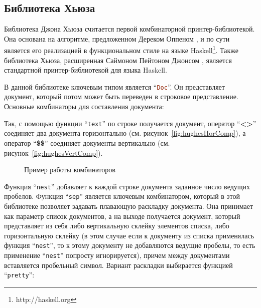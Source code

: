 \subsection{Библиотека Хьюза}

Библиотека Джона Хьюза\cite{hughes} считается первой комбинаторной принтер-библиотекой. Она основана на алгоритме, предложенном Дереком Оппеном \cite{oppen}, и по сути является его реализацией в функциональном стиле на языке Haskell\footnote{http://haskell.org}. Также библиотека Хьюза, расширенная Саймоном Пейтоном Джонсом \cite{peytonJones}, является стандартной принтер-библиотекой для языка Haskell.


В данной библиотеке ключевым типом является “\lstinline[language=Haskell]{Doc}”. Он представляет документ, который потом может быть переведен в строковое представление.
Основные комбинаторы для составления документа:


Так, с помощью функции “\lstinline[language=Haskell]{text}” по строке получается документ, оператор “\textbf{<>}” соединяет два документа горизонтально (см. рисунок~\ref{fig:hughesHorComp}), а оператор “\textbf{\$\$}” соединяет документы вертикально (см. рисунок~\ref{fig:hughesVertComp}).

\begin{figure}[ht]
	\quad

	\caption{Пример работы комбинаторов}
\end{figure}

Функция “\lstinline[language=Haskell]{nest}” добавляет к каждой строке документа заданное число ведущих пробелов. Функция “\lstinline[language=Haskell]{sep}” является ключевым комбинатором, который в этой библиотеке позволяет задавать плавающую раскладку документа. Она принимает как параметр список документов, а на выходе получается документ, который представляет из себя либо вертикальную склейку элементов списка, либо горизонтальную склейку (в этом случае если к документу из списка применялась функция “\lstinline[language=Haskell]{nest}”, то к этому документу не добавляются ведущие пробелы, то есть применение “\lstinline[language=Haskell]{nest}” попросту игнорируется), причем между документами вставляется пробельный символ. Вариант раскладки выбирается функцией “\lstinline[language=Haskell]{pretty}”:

